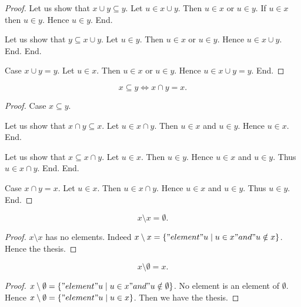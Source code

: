 \documentclass[../../sets-and-functions.ftl.tex]{subfiles}
\begin{document}
\begin{forthel}
\begin{proof}
        Let us show that $x \cup y \subseteq y$.
          Let $u \in x \cup y$.
          Then $u \in x$ or $u \in y$.
          If $u \in x$ then $u \in y$.
          Hence $u \in y$.
        End.

        Let us show that $y \subseteq x \cup y$.
          Let $u \in y$.
          Then $u \in x$ or $u \in y$.
          Hence $u \in x \cup y$.
        End.
      End.

      Case $x \cup y = y$.
        Let $u \in x$.
        Then $u \in x$ or $u \in y$.
        Hence $u \in x \cup y = y$.
      End.
    \end{proof}


    \begin{proposition}[SF 01 01 681535]
      $$x \subseteq y \iff x \cap y = x.$$
    \end{proposition}
    \begin{proof}
      Case $x \subseteq y$.

        Let us show that $x \cap y \subseteq x$.
          Let $u \in x \cap y$.
          Then $u \in x$ and $u \in y$.
          Hence $u \in x$.
        End.

        Let us show that $x \subseteq x \cap y$.
          Let $u \in x$.
          Then $u \in y$.
          Hence $u \in x$ and $u \in y$.
          Thus $u \in x \cap y$.
        End.
      End.

      Case $x \cap y = x$.
        Let $u \in x$.
        Then $u \in x \cap y$.
        Hence $u \in x$ and $u \in y$.
        Thus $u \in y$.
      End.
    \end{proof}

    \begin{proposition}[SF 01 01 402739]
      $$x \setminus x = \emptyset.$$
    \end{proposition}
    \begin{proof}
      $x \setminus x$ has no elements.
      Indeed $x \setminus x = \{ "element" u \mid u \in x "and" u \notin x \}$.
      Hence the thesis.
    \end{proof}


    \begin{proposition}[SF 01 01 661163]
      $$x \setminus \emptyset = x.$$
    \end{proposition}
    \begin{proof}
      $x \setminus \emptyset = \{ "element" u \mid u \in x "and" u \notin \emptyset \}$.
      No element is an element of $\emptyset$.
      Hence $x \setminus \emptyset = \{ "element" u \mid u \in x \}$.
      Then we have the thesis.
    \end{proof}


\end{forthel}
\end{document}
